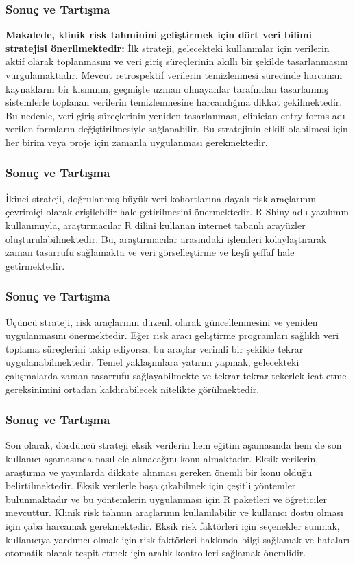\documentclass{beamer}
\begin{document}
\begin{frame}
\frametitle{Sonuç ve Tartışma}
\textbf{Makalede, klinik risk tahminini geliştirmek için dört veri bilimi stratejisi önerilmektedir:} 
\newline
\newline
İlk strateji, gelecekteki kullanımlar için verilerin aktif olarak toplanmasını ve veri giriş süreçlerinin akıllı bir şekilde tasarlanmasını vurgulamaktadır. Mevcut retrospektif verilerin temizlenmesi sürecinde harcanan kaynakların bir kısmının, geçmişte uzman olmayanlar tarafından tasarlanmış sistemlerle toplanan verilerin temizlenmesine harcandığına dikkat çekilmektedir. Bu nedenle, veri giriş süreçlerinin yeniden tasarlanması, clinician entry forms adı verilen formların değiştirilmesiyle sağlanabilir. Bu stratejinin etkili olabilmesi için her birim veya proje için zamanla uygulanması gerekmektedir.

\end{frame}

\begin{frame}
\frametitle{Sonuç ve Tartışma}
İkinci strateji, doğrulanmış büyük veri kohortlarına dayalı risk araçlarının çevrimiçi olarak erişilebilir hale getirilmesini önermektedir. R Shiny adlı yazılımın kullanımıyla, araştırmacılar R dilini kullanan internet tabanlı arayüzler oluşturulabilmektedir. Bu, araştırmacılar arasındaki işlemleri kolaylaştırarak zaman tasarrufu sağlamakta ve veri görselleştirme ve keşfi şeffaf hale getirmektedir.

\end{frame}

\begin{frame}
\frametitle{Sonuç ve Tartışma}
Üçüncü strateji, risk araçlarının düzenli olarak güncellenmesini ve yeniden uygulanmasını önermektedir. Eğer risk aracı geliştirme programları sağlıklı veri toplama süreçlerini takip ediyorsa, bu araçlar verimli bir şekilde tekrar uygulanabilmektedir. Temel yaklaşımlara yatırım yapmak, gelecekteki çalışmalarda zaman tasarrufu sağlayabilmekte ve tekrar tekrar tekerlek icat etme gereksinimini ortadan kaldırabilecek nitelikte görülmektedir.

\end{frame}

\begin{frame}
\frametitle{Sonuç ve Tartışma}
Son olarak, dördüncü strateji eksik verilerin hem eğitim aşamasında hem de son kullanıcı aşamasında nasıl ele alınacağını konu almaktadır. Eksik verilerin, araştırma ve yayınlarda dikkate alınması gereken önemli bir konu olduğu belirtilmektedir. Eksik verilerle başa çıkabilmek için çeşitli yöntemler bulunmaktadır ve bu yöntemlerin uygulanması için R paketleri ve öğreticiler mevcuttur. Klinik risk tahmin araçlarının kullanılabilir ve kullanıcı dostu olması için çaba harcamak gerekmektedir. Eksik risk faktörleri için seçenekler sunmak, kullanıcıya yardımcı olmak için risk faktörleri hakkında bilgi sağlamak ve hataları otomatik olarak tespit etmek için aralık kontrolleri sağlamak önemlidir.

\end{frame}
\end{document}
